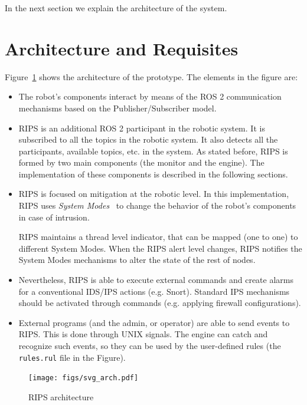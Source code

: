 \documentclass[a4paper]{article}
\begin{document}
In the next section we explain the architecture of the system.

\section{Architecture and Requisites}

Figure~\ref{fig:arch} shows the architecture of the prototype.
The elements in the figure are:

\begin{itemize}
	\item The robot's components interact by means of the ROS 2 communication mechanisms
	based on the Publisher/Subscriber model.

	\item RIPS is an additional
	ROS 2 participant in the robotic system. It is subscribed to all the topics
	in the robotic system. It also detects all the participants, available
	topics, etc. in the system. As stated before, RIPS is formed by
	two main components (the monitor and the engine).
	The implementation of these components is described in the following sections.

	\item RIPS is focused on mitigation at the robotic level. In this implementation, RIPS uses
	\textit{System Modes}~\cite{9474424} to change the behavior of the
	robot's components in case of intrusion.

	RIPS maintains a thread level indicator, that can be mapped (one to one) to different
	System Modes. When the RIPS alert level changes, RIPS notifies the System
	Modes mechanisms to alter the state of the rest of nodes.

	\item Nevertheless, RIPS is able to execute external commands and create alarms
	for a conventional IDS/IPS actions (e.g. Snort). Standard IPS mechanisms
	should be activated through commands (e.g. applying firewall configurations).

	\item External programs (and the admin, or operator) are able to
	send events to RIPS. This is done through UNIX signals. The engine
	can catch and recognize such events, so they can be used by the
	user-defined rules (the \texttt{rules.rul} file in the Figure).
\end{itemize}

\begin{figure}[t!]
\begin{center}
\texttt{[image: figs/svg\_arch.pdf]}
\caption{RIPS architecture \label{fig:arch}}
\end{center}
\end{figure}
\end{document}
